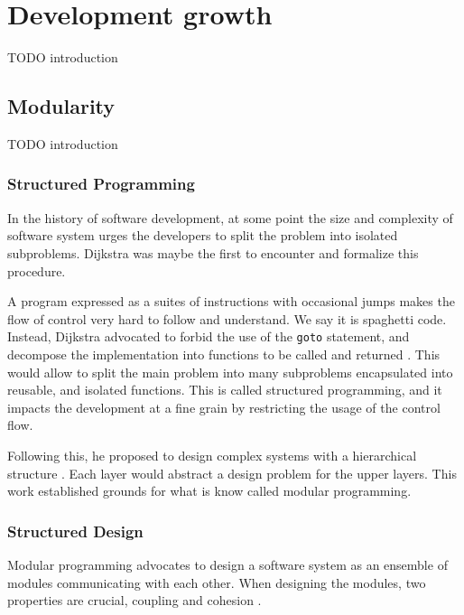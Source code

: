 \section{Development growth}

TODO introduction

\subsection{Modularity}

TODO introduction

\subsubsection{Structured Programming}

In the history of software development, at some point the size and complexity of software system urges the developers to split the problem into isolated subproblems.
Dijkstra was maybe the first to encounter and formalize this procedure.

A program expressed as a suites of instructions with occasional jumps makes the flow of control very hard to follow and understand.
We say it is spaghetti code.
Instead, Dijkstra advocated to forbid the use of the \texttt{goto} statement, and decompose the implementation into functions to be called and returned \cite{Dijkstra1968a}.
This would allow to split the main problem into many subproblems encapsulated into reusable, and isolated functions.
This is called structured programming, and it impacts the development at a fine grain by restricting the usage of the control flow.

Following this, he proposed to design complex systems with a hierarchical structure \cite{Dijkstra1968}.
Each layer would abstract a design problem for the upper layers.
This work established grounds for what is know called modular programming.


\subsubsection{Structured Design}

Modular programming advocates to design a software system as an ensemble of modules communicating with each other.
When designing the modules, two properties are crucial, coupling and cohesion \cite{Stevens1974}.

